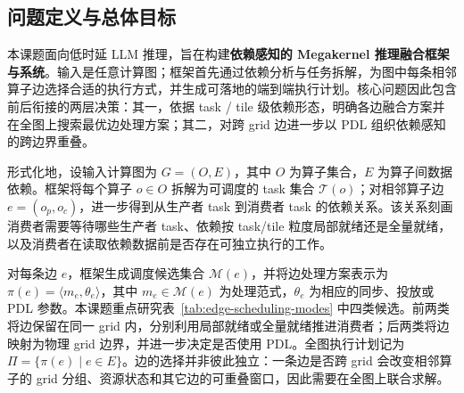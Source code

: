 \subsection{问题定义与总体目标}
\label{sec:purpose}

本课题面向低时延 LLM 推理，旨在构建\textbf{依赖感知的 Megakernel 推理融合框架与系统}。输入是任意计算图；框架首先通过依赖分析与任务拆解，为图中每条相邻算子边选择合适的执行方式，并生成可落地的端到端执行计划。核心问题因此包含前后衔接的两层决策：其一，依据 task / tile 级依赖形态，明确各边融合方案并在全图上搜索最优边处理方案；其二，对跨 grid 边进一步以 PDL 组织依赖感知的跨边界重叠。

形式化地，设输入计算图为 $G=(O,E)$，其中 $O$ 为算子集合，$E$ 为算子间数据依赖。框架将每个算子 $o\in O$ 拆解为可调度的 task 集合 $\mathcal{T}(o)$；对相邻算子边 $e=(o_p,o_c)$，进一步得到从生产者 task 到消费者 task 的依赖关系。该关系刻画消费者需要等待哪些生产者 task、依赖按 task/tile 粒度局部就绪还是全量就绪，以及消费者在读取依赖数据前是否存在可独立执行的工作。

对每条边 $e$，框架生成调度候选集合 $\mathcal{M}(e)$，并将边处理方案表示为 $\pi(e)=\langle m_e,\theta_e\rangle$，其中 $m_e\in\mathcal{M}(e)$ 为处理范式，$\theta_e$ 为相应的同步、投放或 PDL 参数。本课题重点研究表~\ref{tab:edge-scheduling-modes} 中四类候选。前两类将边保留在同一 grid 内，分别利用局部就绪或全量就绪推进消费者；后两类将边映射为物理 grid 边界，并进一步决定是否使用 PDL。全图执行计划记为 $\Pi=\{\pi(e)\mid e\in E\}$。边的选择并非彼此独立：一条边是否跨 grid 会改变相邻算子的 grid 分组、资源状态和其它边的可重叠窗口，因此需要在全图上联合求解。


